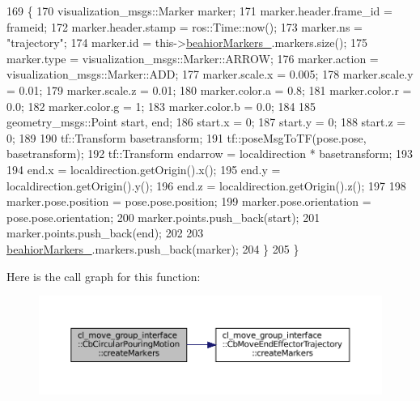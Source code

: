\begin{DoxyCode}
169         \{
170             visualization\_msgs::Marker marker;
171             marker.header.frame\_id = frameid;
172             marker.header.stamp = ros::Time::now();
173             marker.ns = \textcolor{stringliteral}{"trajectory"};
174             marker.id = this->\hyperlink{classcl__move__group__interface_1_1CbMoveEndEffectorTrajectory_a809fb5385adf27c0a1c8f8136566949c}{beahiorMarkers\_}.markers.size();
175             marker.type = visualization\_msgs::Marker::ARROW;
176             marker.action = visualization\_msgs::Marker::ADD;
177             marker.scale.x = 0.005;
178             marker.scale.y = 0.01;
179             marker.scale.z = 0.01;
180             marker.color.a = 0.8;
181             marker.color.r = 0.0;
182             marker.color.g = 1;
183             marker.color.b = 0.0;
184 
185             geometry\_msgs::Point start, end;
186             start.x = 0;
187             start.y = 0;
188             start.z = 0;
189 
190             tf::Transform basetransform;
191             tf::poseMsgToTF(pose.pose, basetransform);
192             tf::Transform endarrow = localdirection * basetransform;
193 
194             end.x = localdirection.getOrigin().x();
195             end.y = localdirection.getOrigin().y();
196             end.z = localdirection.getOrigin().z();
197 
198             marker.pose.position = pose.pose.position;
199             marker.pose.orientation = pose.pose.orientation;
200             marker.points.push\_back(start);
201             marker.points.push\_back(end);
202 
203             \hyperlink{classcl__move__group__interface_1_1CbMoveEndEffectorTrajectory_a809fb5385adf27c0a1c8f8136566949c}{beahiorMarkers\_}.markers.push\_back(marker);
204         \}
205     \}
\end{DoxyCode}
Here is the call graph for this function\+:
\nopagebreak
\begin{figure}[H]
\begin{center}
\leavevmode
\includegraphics[width=350pt]{classcl__move__group__interface_1_1CbCircularPouringMotion_a26d603b1d9bdbf5b71da6c1c4af2c322_cgraph}
\end{center}
\end{figure}
\mbox{\label{classcl__move__group__interface_1_1CbCircularPouringMotion_a9150bb3731082aad3af2d7d6e067a344}} 
